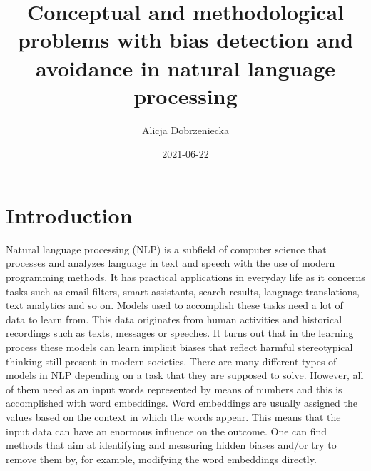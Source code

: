 \documentclass[12pt,]{book}
\title{Conceptual and methodological problems with bias detection and avoidance
in natural language processing}
\author{Alicja Dobrzeniecka}
\date{2021-06-22}
\begin{document}
\maketitle

{
\hypersetup{linkcolor=black}
\setcounter{tocdepth}{5}
\tableofcontents
}
\chapter{Introduction}\label{introduction}

Natural language processing (NLP) is a subfield of computer science that
processes and analyzes language in text and speech with the use of
modern programming methods. It has practical applications in everyday
life as it concerns tasks such as email filters, smart assistants,
search results, language translations, text analytics and so on. Models
used to accomplish these tasks need a lot of data to learn from. This
data originates from human activities and historical recordings such as
texts, messages or speeches. It turns out that in the learning process
these models can learn implicit biases that reflect harmful
stereotypical thinking still present in modern societies. There are many
different types of models in NLP depending on a task that they are
supposed to solve. However, all of them need as an input words
represented by means of numbers and this is accomplished with word
embeddings. Word embeddings are usually assigned the values based on the
context in which the words appear. This means that the input data can
have an enormous influence on the outcome. One can find methods that aim
at identifying and measuring hidden biases and/or try to remove them by,
for example, modifying the word embeddings directly.
\end{document}
